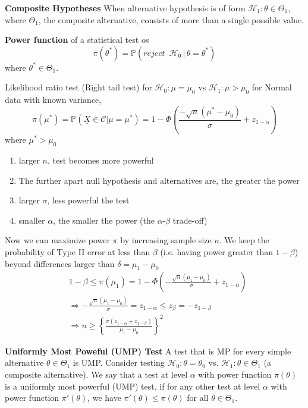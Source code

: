 \documentclass[11pt]{article}
\begin{document}
\begin{defn*}
  \textbf{Composite Hypotheses} When alternative hypothesis is of form $\mathcal{H}_1: \theta\in\Theta_1$, where $\Theta_1$, the composite alternative, consists of more than a single possible value.
\end{defn*}

\begin{defn*}
  \textbf{Power function} of a statistical test os
  \[
    \pi(\theta^*) = \mathbb{P}\left( reject\enspace \mathcal{H}_0 \,|\, \theta = \theta^* \right)
  \]
  where $\theta^* \in\Theta_1$.
\end{defn*}

\begin{example}
  Likelihood ratio test (Right tail test) for $\mathcal{H}_0: \mu = \mu_0$ vs $\mathcal{H}_1: \mu > \mu_0$ for Normal data with known variance,
  \[
    \pi(\mu^*) = \mathbb{P}(\underline{X} \in \mathcal{C} | \mu = \mu^*) = 1 - \Phi\left( \frac{-\sqrt{n}(\mu^* - \mu_0)}{\sigma} + z_{1 - \alpha} \right)
  \]
  where $\mu^* > \mu_0$
  \begin{enumerate}
    \item larger $n$, test becomes more powerful
    \item The further apart null hypothesis and alternatives are, the greater the power
    \item larger $\sigma$, less powerful the test
    \item smaller $\alpha$, the smaller the power (the $\alpha$-$\beta$ trade-off)
  \end{enumerate}
  Now we can maximize power $\pi$ by increasing sample size $n$. We keep the probability of Type II error at less than $\beta$ (i.e. having power greater than $1 - \beta$) beyond differences larger than $\delta = \mu_1 - \mu_0$
  \begin{align*}
      &1 - \beta \leq \pi(\mu_1) = 1 - \Phi( - \frac{\sqrt{n}(\mu_1 - \mu_0)}{\sigma} + z_{1 - \alpha}) \\
      &\Rightarrow -\frac{\sqrt{n}(\mu_1 - \mu_0)}{\sigma} = z_{1 - \alpha} \leq z_{\beta} = -z_{1 - \beta}\\
      &\Rightarrow n \geq \left\{ \frac{\sigma(z_{1 - \alpha} + z_{1 - \beta})}{\mu_1 - \mu_0} \right\}^2
  \end{align*}


\end{example}

\begin{defn*}
  \textbf{Uniformly Most Poweful (UMP) Test} A test that is MP for every simple alternative $\theta \in \Theta_1$ is UMP. Consider testing $\mathcal{H}_0: \theta = \theta_0$ vs. $\mathcal{H}_1: \theta\in \Theta_1$ (a composite alternative). We say that a test at level $\alpha$ with power function $\pi(\theta)$ is a uniformly most powerful (UMP) test, if for any other test at level $\alpha$ with power function $\pi'(\theta)$, we have $\pi'(\theta) \leq \pi(\theta)$ for all $\theta \in \Theta_1$.
\end{defn*}
\end{document}
